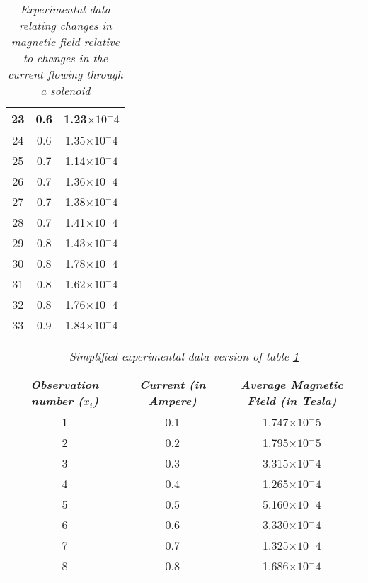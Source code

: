 \begin{table}[H]
\begin{tabular}{|c|c|c|}
            \hline
            23 & 0.6 & 1.23$\times10^-4$ \\
            \hline
            24 & 0.6 & 1.35$\times10^-4$ \\
            \hline
            25 & 0.7 & 1.14$\times10^-4$ \\
            \hline
            26 & 0.7 & 1.36$\times10^-4$ \\
            \hline
            27 & 0.7 & 1.38$\times10^-4$ \\
            \hline
            28 & 0.7 & 1.41$\times10^-4$ \\
            \hline
            29 & 0.8 & 1.43$\times10^-4$ \\
            \hline
            30 & 0.8 & 1.78$\times10^-4$ \\
            \hline
            31 & 0.8 & 1.62$\times10^-4$ \\
            \hline
            32 & 0.8 & 1.76$\times10^-4$ \\
            \hline
            33 & 0.9 & 1.84$\times10^-4$ \\
            \hline
            \hline
            \end{tabular}
        \caption{\textit{Experimental data relating changes in magnetic field relative to changes in the current flowing through a solenoid}} 
        \label{exp1}
\end{table}

\begin{table}[H]
    \centering
        \begin{tabular}{|c|c|c|}
        \hline\hline
                \textit{Observation number ($x_i$)} & \textit{Current (in Ampere)} & \textit{Average Magnetic Field (in Tesla)}\\
                \hline
                \hline
                1 & 0.1 & 1.747$\times10^-5$ \\
                \hline
                2 & 0.2 & 1.795$\times10^-5$ \\
                \hline
                3 & 0.3 & 3.315$\times10^-4$ \\
                \hline
                4 & 0.4 & 1.265$\times10^-4$ \\
                \hline
                5 & 0.5 & 5.160$\times10^-4$ \\
                \hline
                6 & 0.6 & 3.330$\times10^-4$ \\
                \hline
                7 & 0.7 & 1.325$\times10^-4$ \\
                \hline
                8 & 0.8 & 1.686$\times10^-4$ \\
                \hline
                \hline
        \end{tabular}
    \caption{\textit{Simplified experimental data version of table \ref{exp1}}}
\end{table}  

